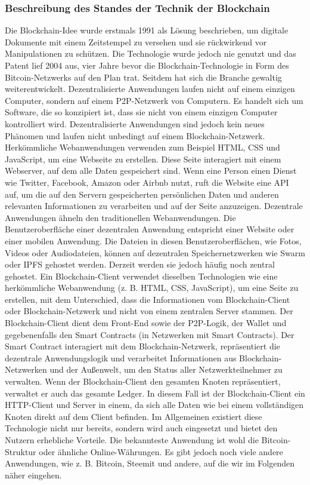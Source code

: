 \subsubsection{Beschreibung des Standes der Technik der Blockchain}
Die Blockchain-Idee wurde erstmals 1991 als Lösung beschrieben, um digitale Dokumente mit einem Zeitstempel zu versehen und sie rückwirkend vor Manipulationen zu schützen. Die Technologie wurde jedoch nie genutzt und das Patent lief 2004 aus, vier Jahre bevor die Blockchain-Technologie in Form des Bitcoin-Netzwerks auf den Plan trat. Seitdem hat sich die Branche gewaltig weiterentwickelt.
Dezentralisierte Anwendungen laufen nicht auf einem einzigen Computer, sondern auf einem P2P-Netzwerk von Computern. Es handelt sich um Software, die so konzipiert ist, dass sie nicht von einem einzigen Computer kontrolliert wird. Dezentralisierte Anwendungen sind jedoch kein neues Phänomen und laufen nicht unbedingt auf einem Blockchain-Netzwerk.  Herkömmliche Webanwendungen verwenden zum Beispiel HTML, CSS und JavaScript, um eine Webseite zu erstellen.
Diese Seite interagiert mit einem Webserver, auf dem alle Daten gespeichert sind.
Wenn eine Person einen Dienst wie Twitter, Facebook, Amazon oder Airbnb nutzt, ruft die Website eine API auf, um die auf den Servern gespeicherten persönlichen Daten und anderen relevanten Informationen zu verarbeiten und auf der Seite anzuzeigen.
Dezentrale Anwendungen ähneln den traditionellen Webanwendungen.
Die Benutzeroberfläche einer dezentralen Anwendung entspricht einer Website oder einer mobilen Anwendung.
Die Dateien in diesen Benutzeroberflächen, wie Fotos, Videos oder Audiodateien, können auf dezentralen Speichernetzwerken wie Swarm oder IPFS gehostet werden.
Derzeit werden sie jedoch häufig noch zentral gehostet.
Ein Blockchain-Client verwendet dieselben Technologien wie eine herkömmliche Webanwendung (z. B. HTML, CSS, JavaScript), um eine Seite zu erstellen, mit dem Unterschied, dass die Informationen vom Blockchain-Client oder Blockchain-Netzwerk und nicht von einem zentralen Server stammen.
Der Blockchain-Client dient dem Front-End sowie der P2P-Logik, der Wallet und gegebenenfalls den Smart Contracts (in Netzwerken mit Smart Contracts).
Der Smart Contract interagiert mit dem Blockchain-Netzwerk, repräsentiert die dezentrale Anwendungslogik und verarbeitet Informationen aus Blockchain-Netzwerken und der Außenwelt, um den Status aller Netzwerkteilnehmer zu verwalten. Wenn der Blockchain-Client den gesamten Knoten repräsentiert, verwaltet er auch das gesamte Ledger.
In diesem Fall ist der Blockchain-Client ein HTTP-Client und Server in einem, da sich alle Daten wie bei einem vollständigen Knoten direkt auf dem Client befinden.
Im Allgemeinen existiert diese Technologie nicht nur bereits, sondern wird auch eingesetzt und bietet den Nutzern erhebliche Vorteile.
Die bekannteste Anwendung ist wohl die Bitcoin-Struktur oder ähnliche Online-Währungen.
Es gibt jedoch noch viele andere Anwendungen, wie z. B. Bitcoin, Steemit und andere, auf die wir im Folgenden näher eingehen.

